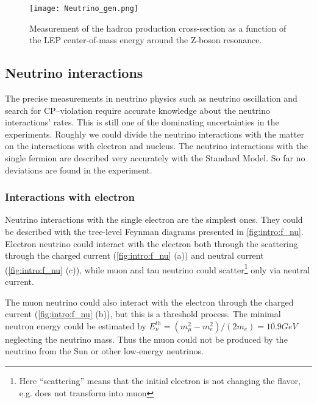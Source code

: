 \documentclass[../main.tex]{subfiles}
\begin{document}
\begin{figure}[!ht]
    \centering
    \texttt{[image: Neutrino\_gen.png]}
    \caption{Measurement of the hadron production cross-section as a function of the LEP center-of-mass energy around the Z-boson resonance.}
    \label{fig:intro:NuGen}
\end{figure}

\subsection{Neutrino interactions}
The precise measurements in neutrino physics such as neutrino oscillation and search for CP--violation require accurate knowledge about the neutrino interactions' rates. This is still one of the dominating uncertainties in the experiments. Roughly we could divide the neutrino interactions with the matter on the interactions with electron and nucleus. The neutrino interactions with the single fermion are described very accurately with the Standard Model. So far no deviations are found in the experiment.

\subsubsection{Interactions with electron}
Neutrino interactions with the single electron are the simplest ones. They could be described with the tree-level Feynman diagrams presented in \autoref{fig:intro:f_nu}. Electron neutrino could interact with the electron both through the scattering through the charged current (\autoref{fig:intro:f_nu} (a)) and neutral current (\autoref{fig:intro:f_nu} (c)), while muon and tau neutrino could scatter\footnote{Here ``scattering'' means that the initial electron is not changing the flavor, e.g. does not transform into muon} only via neutral current.

The muon neutrino could also interact with the electron through the charged current (\autoref{fig:intro:f_nu} (b)), but this is a threshold process. The minimal neutron energy could be estimated by $E_\nu^{th}=\left(m_\mu^2-m_e^2\right)/\left(2m_e\right)=10.9GeV$ neglecting the neutrino mass. Thus the muon could not be produced by the neutrino from the Sun or other low-energy neutrinos.
\end{document}
